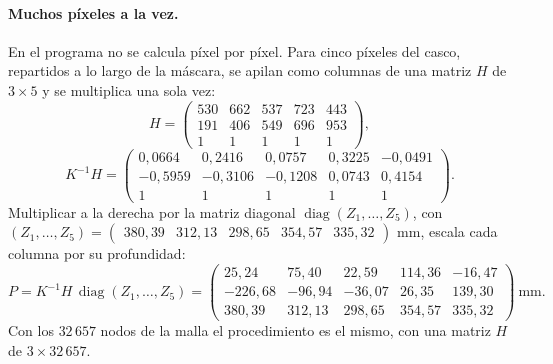 \paragraph{Muchos píxeles a la vez.} En el programa no se calcula píxel por píxel. Para cinco píxeles del casco, repartidos
a lo largo de la máscara, se apilan como columnas de una matriz $H$ de $3\times5$ y se multiplica una sola vez:
\begin{equation}
H=\begin{pmatrix} 530 & 662 & 537 & 723 & 443 \\ 191 & 406 & 549 & 696 & 953 \\ 1 & 1 & 1 & 1 & 1 \end{pmatrix},
\end{equation}
\begin{equation}
K^{-1}H=\begin{pmatrix} 0{,}0664 & 0{,}2416 & 0{,}0757 & 0{,}3225 & -0{,}0491 \\ -0{,}5959 & -0{,}3106 & -0{,}1208 & 0{,}0743 & 0{,}4154 \\ 1 & 1 & 1 & 1 & 1 \end{pmatrix} .
\end{equation}
Multiplicar a la derecha por la matriz diagonal $\operatorname{diag}(Z_1,\dots,Z_5)$, con
$(Z_1,\dots,Z_5)=\begin{pmatrix} 380{,}39 & 312{,}13 & 298{,}65 & 354{,}57 & 335{,}32 \end{pmatrix}$ mm, escala cada columna por su profundidad:
\begin{equation}
P=K^{-1}H\,\operatorname{diag}(Z_1,\dots,Z_5)=\begin{pmatrix} 25{,}24 & 75{,}40 & 22{,}59 & 114{,}36 & -16{,}47 \\ -226{,}68 & -96{,}94 & -36{,}07 & 26{,}35 & 139{,}30 \\ 380{,}39 & 312{,}13 & 298{,}65 & 354{,}57 & 335{,}32 \end{pmatrix}\ \text{mm}.
\end{equation}
Con los $32\,657$ nodos de la malla el procedimiento es el mismo, con una matriz $H$ de $3\times32\,657$.
